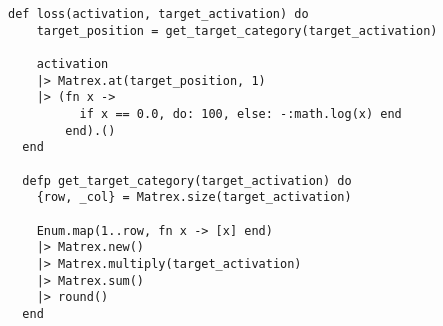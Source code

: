 \begin{lstlisting}[caption={Cost Function}, label={cost_function}]
  def loss(activation, target_activation) do
    target_position = get_target_category(target_activation)

    activation
    |> Matrex.at(target_position, 1)
    |> (fn x ->
          if x == 0.0, do: 100, else: -:math.log(x) end
        end).()
  end

  defp get_target_category(target_activation) do
    {row, _col} = Matrex.size(target_activation)

    Enum.map(1..row, fn x -> [x] end)
    |> Matrex.new()
    |> Matrex.multiply(target_activation)
    |> Matrex.sum()
    |> round()
  end
\end{lstlisting}
